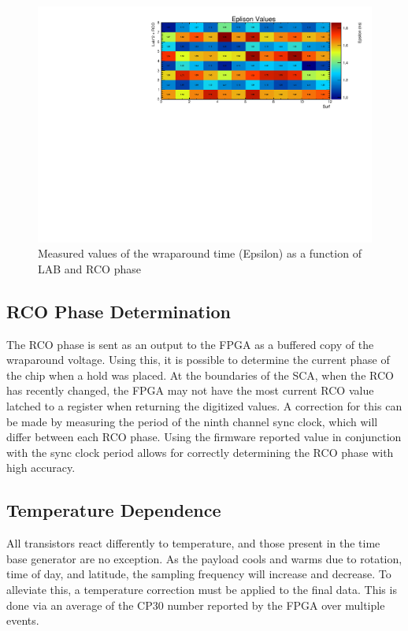 		
	\begin{figure}
		\includegraphics[width=\textwidth]{figures/epsilons}
		\caption{Measured values of the wraparound time (Epsilon) as a function of LAB and RCO phase}
		\label{fig:epsilonValues}
	\end{figure}

		
		
	\subsection{RCO Phase Determination}
		The RCO phase is sent as an output to the FPGA as a buffered copy of the wraparound voltage.  Using this, it is possible to determine the current phase of the chip when a hold was placed.  At the boundaries of the SCA, when the RCO has recently changed, the FPGA may not have the most current RCO value latched to a register when returning the digitized values.  A correction for this can be made by measuring the period of the ninth channel sync clock, which will differ between each RCO phase.  Using the firmware reported value in conjunction with the sync clock period allows for correctly determining the RCO phase with high accuracy.

	\subsection{Temperature Dependence}	
		All transistors react differently to temperature, and those present in the time base generator are no exception.  As the payload cools and warms due to rotation, time of day, and latitude, the sampling frequency will increase and decrease.  To alleviate this, a temperature correction must be applied to the final data. This is done via an average of the CP30 number reported by the FPGA over multiple events.
		

